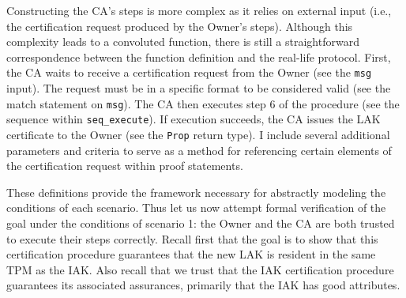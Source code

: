 Constructing the CA's steps is more complex as it relies on external input (i.e., the certification request produced by the Owner's steps). Although this complexity leads to a convoluted function, there is still a straightforward correspondence between the function definition and the real-life protocol. First, the CA waits to receive a certification request from the Owner (see the \verb|msg| input). The request must be in a specific format to be considered valid (see the match statement on \verb|msg|). The CA then executes step 6 of the procedure (see the sequence within \verb|seq_execute|). If execution succeeds, the CA issues the LAK certificate to the Owner (see the \verb|Prop| return type). I include several additional parameters and criteria to serve as a method for referencing certain elements of the certification request within proof statements.



These definitions provide the framework necessary for abstractly modeling the conditions of each scenario. 
Thus let us now attempt formal verification of the goal under the conditions of scenario 1: the Owner and the CA are both trusted to execute their steps correctly. Recall first that the goal is to show that this certification procedure guarantees that the new LAK is resident in the same TPM as the IAK. Also recall that we trust that the IAK certification procedure guarantees its associated assurances, primarily that the IAK has good attributes. 

